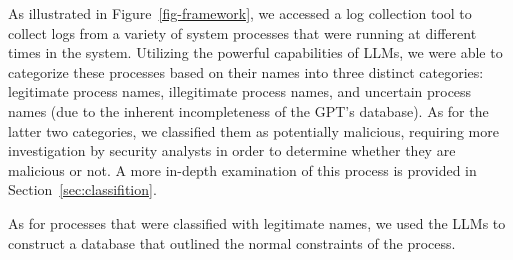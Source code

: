 As illustrated in Figure~\ref{fig-framework}, we accessed a log collection tool to collect logs from a variety of system processes that were running at different times in the system. Utilizing the powerful capabilities of LLMs, we were able to categorize these processes based on their names into three distinct categories: legitimate process names, illegitimate process names, and uncertain process names (due to the inherent incompleteness of the GPT's database). As for the latter two categories, we classified them as potentially malicious, requiring more investigation by security analysts in order to determine whether they are malicious or not. A more in-depth examination of this process is provided in Section~\ref{sec:classifition}.

As for processes that were classified with legitimate names, we used the LLMs to construct a database that outlined the normal constraints of the process.

